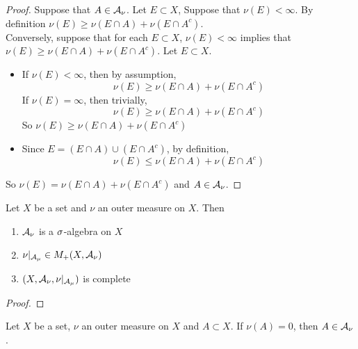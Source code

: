 \documentclass{book}
\begin{document}
	\begin{proof}
	Suppose that $A \in \mathcal{A}_{\nu}$. Let $E \subset X$, Suppose that $\nu(E) < \infty$. By definition $\nu(E) \geq \nu(E \cap A) + \nu(E \cap A^c)$. \\
	Conversely, suppose that for each $E \subset X$, $\nu(E) < \infty$ implies that $\nu(E) \geq \nu(E \cap A) + \nu(E \cap A^c)$. Let $E \subset X$. 
	\begin{itemize}
	\item If $\nu(E) < \infty$, then by assumption, 
	\begin{equation*}
	\nu(E) \geq \nu(E \cap A) + \nu(E \cap A^c)
	\end{equation*}		
	If $\nu(E) = \infty$, then trivially, 
	\begin{equation*}
	\nu(E) \geq \nu(E \cap A) + \nu(E \cap A^c)
	\end{equation*}	 
	So $\nu(E) \geq \nu(E \cap A) + \nu(E \cap A^c)$
	\item Since $E = (E \cap A) \cup (E \cap A^c)$, by definition, 
	\begin{equation*}
	\nu(E) \leq \nu(E \cap A) + \nu(E \cap A^c)
	\end{equation*}	
	\end{itemize}
	So $\nu(E) = \nu(E \cap A) + \nu(E \cap A^c)$ and $A \in \mathcal{A}_{\nu}$.
	\end{proof}





	
	\begin{ex}   
		Let $X$ be a set and $\nu$ an outer measure on $X$. Then  
		\begin{enumerate}
			\item $\mathcal{A}_{\nu}$ is a $\sigma$-algebra on $X$
			\item $\nu|_{\mathcal{A}_{\mu}} \in M_+(X, \mathcal{A}_{\nu})$
			\item $(X, \mathcal{A}_{\nu}, \nu|_{\mathcal{A}_{\mu}})$ is complete
		\end{enumerate}
	\end{ex}
	
	\begin{proof}
	\end{proof}

	\begin{ex}
		Let $X$ be a set, $\nu$ an outer measure on $X$ and $A \subset X$. If $\nu(A) = 0$, then $A \in \mathcal{A}_{\nu}$.
	\end{ex}
	
\end{document}
